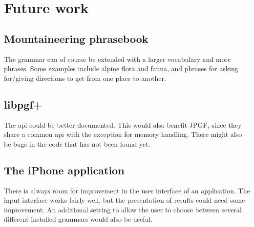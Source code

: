 \section{Future work}


\subsection{Mountaineering phrasebook}
The grammar can of course be extended with a larger vocabulary and more phrases. Some examples include alpine flora and fauna, and phrases for asking for/giving directions to get from one place to another.


\subsection{libpgf+}
The api could be better documented. This would also benefit JPGF, since they share a common api with the exception for memory handling. There might also be bugs in the code that has not been found yet.


\subsection{The iPhone application}
There is always room for improvement in the user interface of an application. The input interface works fairly well, but the presentation of results could need some improvement. An additional setting to allow the user to choose between several different installed grammars would also be useful.
